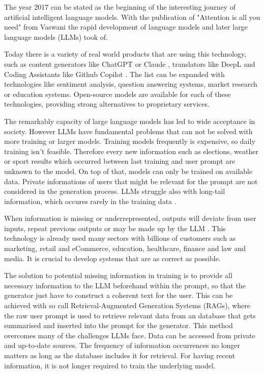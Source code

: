 The year 2017 can be stated as the beginning of the interesting journey of artificial intelligent language models. With the publication of "Attention is all you need" from Vaswani \cite{vaswani2023attentionneed} the rapid development of language models and later large language models (LLMs) took of. 

Today there is a variety of real world products that are using this technology, such as content generators like ChatGPT \cite{OpenAI_2022} or Claude \cite{Anthropic_2023}, translators like DeepL \cite{DeepL_SE} and Coding Assistants like Github Copilot \cite{Friedman_2022}. The list can be expanded with technologies like sentiment analysis, question answering systems, market research or education systems. Open-source models are available for each of these technologies, providing strong alternatives to proprietary services.

The remarkably capacity of large language models has led to wide acceptance in society. However LLMs have fundamental problems that can not be solved with more training or larger models. Training models frequently is expensive, so daily training isn't feasible. Therefore every new information such as elections, weather or sport results which occurred between last training and user prompt are unknown to the model. On top of that, models can only be trained on available data. Private informations of users that might be relevant for the prompt are not considered in the generation process. LLMs struggle also with long-tail information, which occures rarely in the training data \cite{Kandpal.15.11.2022}.

When information is missing or underrepresented, outputs will deviate from user inputs, repeat previous outputs or may be made up by the LLM \cite{Zhang.03.09.2023}. This technology is already used many sectors with billions of customers such as marketing, retail and eCommerce, education, healthcare, finance and law and media. It is crucial to develop systems that are as correct as possible.

The solution to potential missing information in training is to provide all necessary information to the LLM beforehand within the prompt, so that the generator just have to construct a coherent text for the user. This can be achieved with so call Retrieval-Augmented Generation Systems (RAGs), where the raw user prompt is used to retrieve relevant data from an database that gets summarised and inserted into the prompt for the generator. This method overcomes many of the challenges LLMs face. Data can be accessed from private and up-to-date sources. The frequency of information occurrences no longer matters as long as the database includes it for retrieval. For having recent information, it is not longer required to train the underlying model.

